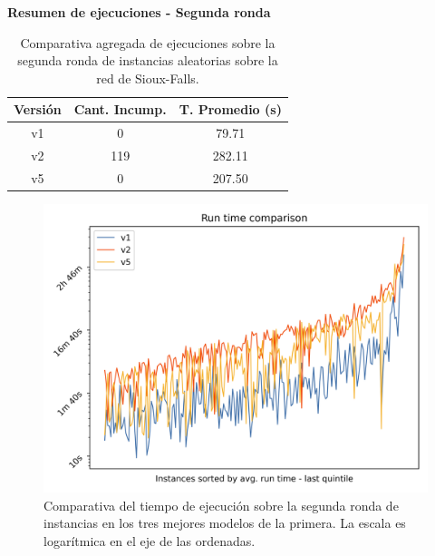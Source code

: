 \documentclass{article}
\begin{document}
  \begin{table}[h!]
    \centering
    \caption*{{\bf Resumen de ejecuciones - Segunda ronda}}
    \begin{tabular}{ccc}
      \toprule
      Versión & Cant. Incump. & T. Promedio (s) \\
      \midrule
      v1 & 0   & 79.71   \\
      v2 & 119 & 282.11  \\
      v5 & 0   & 207.50  \\
      \bottomrule
    \end{tabular}
    \caption{Comparativa agregada de ejecuciones sobre la segunda ronda de instancias aleatorias sobre la red de Sioux-Falls.}\label{table:resumenreejecuciones}
  \end{table}

  \begin{figure}[h!]
    \centering
    \includegraphics[width=12cm]{../resources/run_time_comparsion_rerun.png}
    \caption{Comparativa del tiempo de ejecución sobre la segunda ronda de instancias en los tres mejores modelos de la primera. La escala es logarítmica en el eje de las ordenadas.} \label{fig:runtimecomparisonrerun}
  \end{figure}
\end{document}
